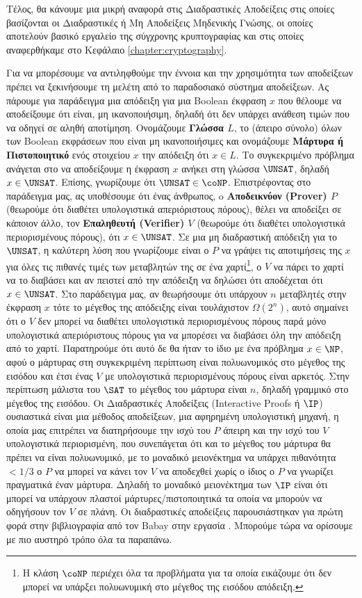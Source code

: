 Τέλος, θα κάνουμε μια μικρή αναφορά στις Διαδραστικές Αποδείξεις στις οποίες βασίζονται οι Διαδραστικές ή Μη Αποδείξεις Μηδενικής Γνώσης, οι οποίες αποτελούν βασικό εργαλείο της σύγχρονης κρυπτογραφίας και στις οποίες αναφερθήκαμε στο Κεφάλαιο \ref{chapter:cryptography}.

Για να μπορέσουμε να αντιληφθούμε την έννοια και την χρησιμότητα των αποδείξεων πρέπει να ξεκινήσουμε τη μελέτη από το παραδοσιακό σύστημα αποδείξεων.  Ας πάρουμε για παράδειγμα μια απόδειξη για μια Boolean έκφραση $x$ που θέλουμε να αποδείξουμε ότι είναι, μη ικανοποιήσιμη, δηλαδή ότι δεν υπάρχει ανάθεση τιμών που να οδηγεί σε αληθή αποτίμηση. Ονομάζουμε \textbf{Γλώσσα $L$}, το (άπειρο σύνολο) όλων των Boolean εκφράσεων που είναι μη ικανοποιήσιμες και ονομάζουμε \textbf{Μάρτυρα ή Πιστοποιητικό} ενός στοιχείου $x$ την απόδειξη ότι $x \in L$. Το συγκεκριμένο πρόβλημα ανάγεται στο να αποδείξουμε η έκφραση $x$ ανήκει στη γλώσσα $\UNSAT$, δηλαδή $x \in \UNSAT$.
Επίσης, γνωρίζουμε ότι $\UNSAT \in \coNP$. Επιστρέφοντας στο παράδειγμα μας, ας υποθέσουμε ότι ένας άνθρωπος, o \textbf{Αποδεικνύον (Prover) $P$} (θεωρούμε ότι διαθέτει υπολογιστικά απεριόριστους πόρους), θέλει να αποδείξει σε κάποιον άλλο, τον \textbf{Επαληθευτή (Verifier) $V$} (θεωρούμε ότι διαθέτει υπολογιστικά περιορισμένους πόρους), ότι $x \in \UNSAT$. Σε μια μη διαδραστική απόδειξη για το $\UNSAT$, η καλύτερη λύση που γνωρίζουμε είναι ο $P$ να γράψει τις αποτιμήσεις της $x$ για όλες τις πιθανές τιμές των μεταβλητών της σε ένα χαρτί\footnote{Η κλάση $\coNP$ περιέχει όλα τα προβλήματα για τα οποία εικάζουμε ότι δεν μπορεί να υπάρξει πολυωνυμική στο μέγεθος της εισόδου απόδειξη.}, ο $V$ να πάρει το χαρτί να το διαβάσει και αν πειστεί από την απόδειξη να δηλώσει ότι αποδέχεται ότι $x \in \UNSAT$. Στο παράδειγμα μας, αν θεωρήσουμε ότι υπάρχουν $n$ μεταβλητές στην έκφραση $x$ τότε το μέγεθος της απόδειξης είναι τουλάχιστον $Ω(2^n)$, αυτό σημαίνει ότι ο $V$ δεν μπορεί να διαθέτει υπολογιστικά περιορισμένους πόρους παρά μόνο υπολογιστικά απεριόριστους πόρους για να μπορέσει να διαβάσει όλη την απόδειξη από το χαρτί. Παρατηρούμε ότι αυτό δε θα ήταν το ίδιο με ένα πρόβλημα $x \in \NP$, αφού ο μάρτυρας στη συγκεκριμένη περίπτωση είναι πολυωνυμικός στο μέγεθος της εισόδου και έτσι ένας $V$ με υπολογιστικά περιορισμένους πόρους είναι αρκετός. Στην περίπτωση μάλιστα του $\SAT$ το μέγεθος του μάρτυρα είναι $n$, δηλαδή γραμμικό στο μέγεθος της εισόδου. Οι Διαδραστικές Αποδείξεις (Interactive Proofs ή $\IP$) ουσιαστικά είναι μια μέθοδος αποδείξεων, μια αφηρημένη υπολογιστική μηχανή, η οποία μας επιτρέπει να διατηρήσουμε την ισχύ του $P$ άπειρη και την ισχύ του $V$ υπολογιστικά περιορισμένη, που συνεπάγεται ότι και το μέγεθος του μάρτυρα θα πρέπει να είναι πολυωνυμικό, με το μοναδικό μειονέκτημα να υπάρχει πιθανότητα $<1/3$ ο $P$ να μπορεί να κάνει τον $V$ να αποδεχθεί χωρίς ο ίδιος ο $P$ να γνωρίζει πραγματικά έναν μάρτυρα. Δηλαδή το μοναδικό μειονέκτημα των $\IP$ είναι ότι μπορεί να υπάρχουν πλαστοί μάρτυρες/πιστοποιητικά τα οποία να μπορούν να οδηγήσουν τον $V$ σε πλάνη. Οι διαδραστικές αποδείξεις παρουσιάστηκαν για πρώτη φορά στην βιβλιογραφία από τον Babay στην εργασία \cite{10.1145/22145.22192} . Μπορούμε τώρα να ορίσουμε με πιο αυστηρό τρόπο όλα τα παραπάνω.

